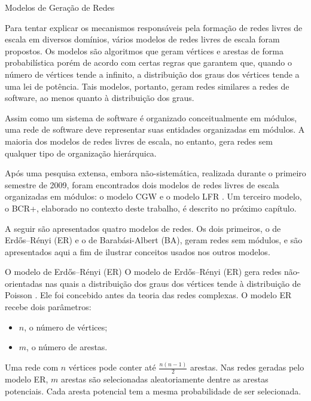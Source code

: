 \begin{section}{Modelos de Geração de Redes}

Para tentar explicar os mecanismos responsáveis pela formação de redes livres de escala em diversos domínios, vários modelos de redes livres de escala foram propostos. Os modelos são algoritmos que geram vértices e arestas de forma probabilística porém de acordo com certas regras que garantem que, quando o número de vértices tende a infinito, a distribuição dos graus dos vértices tende a uma lei de potência. Tais modelos, portanto, geram redes similares a redes de software, ao menos quanto à distribuição dos graus.

Assim como um sistema de software é organizado conceitualmente em módulos, uma rede de software deve representar suas entidades organizadas em módulos. A maioria dos modelos de redes livres de escala, no entanto, gera redes sem qualquer tipo de organização hierárquica.

Após uma pesquisa extensa, embora não-sistemática, realizada durante o primeiro semestre de 2009, foram encontrados dois modelos de redes livres de escala organizadas em módulos: o modelo CGW \cite{Chen2008} e o modelo LFR \cite{Lancichinetti2008,Lancichinetti2009}. Um terceiro modelo, o BCR+, elaborado no contexto deste trabalho, é descrito no próximo capítulo.

A seguir são apresentados quatro modelos de redes. Os dois primeiros, o de Erdős–Rényi (ER) e o de Barabási-Albert (BA), geram redes sem módulos, e são apresentados aqui a fim de ilustrar conceitos usados nos outros modelos.
 

\begin{subsection}{O modelo de Erdős–Rényi (ER)}
	O modelo de Erdős–Rényi (ER) \cite{Erdos1959} gera redes não-orientadas nas quais a distribuição dos graus dos vértices tende à distribuição de Poisson . Ele foi concebido antes da teoria das redes complexas. O modelo ER recebe dois parâmetros:
	
	\begin{itemize}
		\item $n$, o número de vértices;
		\item $m$, o número de arestas.
	\end{itemize}
	
	Uma rede com $n$ vértices pode conter até $\frac{n(n-1)}{2}$ arestas. Nas redes geradas pelo modelo ER, $m$ arestas são selecionadas aleatoriamente dentre as arestas potenciais. Cada aresta potencial tem a mesma probabilidade de ser selecionada.
	

\end{subsection}
\end{section}
